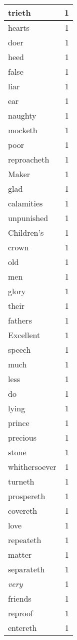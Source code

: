 \begin{center}
\begin{longtable}{l|r}
trieth & 1\\ \hline 
hearts & 1\\ \hline 
doer & 1\\ \hline 
heed & 1\\ \hline 
false & 1\\ \hline 
liar & 1\\ \hline 
ear & 1\\ \hline 
naughty & 1\\ \hline 
mocketh & 1\\ \hline 
poor & 1\\ \hline 
reproacheth & 1\\ \hline 
Maker & 1\\ \hline 
glad & 1\\ \hline 
calamities & 1\\ \hline 
unpunished & 1\\ \hline 
Children's & 1\\ \hline 
crown & 1\\ \hline 
old & 1\\ \hline 
men & 1\\ \hline 
glory & 1\\ \hline 
their & 1\\ \hline 
fathers & 1\\ \hline 
Excellent & 1\\ \hline 
speech & 1\\ \hline 
much & 1\\ \hline 
less & 1\\ \hline 
do & 1\\ \hline 
lying & 1\\ \hline 
prince & 1\\ \hline 
precious & 1\\ \hline 
stone & 1\\ \hline 
whithersoever & 1\\ \hline 
turneth & 1\\ \hline 
prospereth & 1\\ \hline 
covereth & 1\\ \hline 
love & 1\\ \hline 
repeateth & 1\\ \hline 
matter & 1\\ \hline 
separateth & 1\\ \hline 
\emph{very} & 1\\ \hline 
friends & 1\\ \hline 
reproof & 1\\ \hline 
entereth & 1\\ \hline 

\end{longtable}
\end{center}
